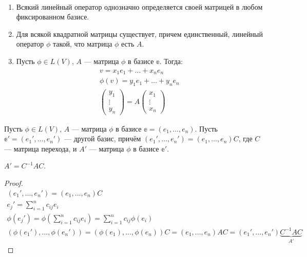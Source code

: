 \begin{Consequence}\
    \begin{enumerate}
        \item Всякий линейный оператор однозначно определяется своей матрицей в любом фиксированном базисе.
        \item Для всякой квадратной матрицы существует, причем единственный, линейный оператор $\phi$ такой, что матрица $\phi$ есть $A$.
        \item Пусть $\phi \in L(V)$, $A$ --- матрица $\phi$ в базисе $\mathbb{e}$. Тогда:
        \begin{gather*}
            v = x_1e_1 + \ldots + x_ne_n\\ \phi(v) = y_1e_1 + \ldots + y_n e_n \\
            \begin{pmatrix}
                y_1\\
                \vdots \\
                y_n
            \end{pmatrix} = A \begin{pmatrix}
                x_1\\
                \vdots \\
                x_n
            \end{pmatrix}
        \end{gather*}
    \end{enumerate}
\end{Consequence}
Пусть $\phi \in L(V)$, $A$ --- матрица $\phi$ в базисе $\mathbb{e} = (e_1, \ldots, e_n)$. Пусть $\mathbb{e}' = (e_1', \ldots, e_n')$ --- другой базис, причём $(e_1', \ldots, e_n') = (e_1, \ldots, e_n)C$, где $C$ --- матрица перехода, и $A'$ --- матрица $\phi$ в базисе $\mathbb{e}'$.
\begin{Suggestion}
    $A' = C^{-1}AC$.
\end{Suggestion}
\begin{proof}
    \begin{gather}
        (e_1', \ldots, e_n') = (e_1, \ldots, e_n)C  \\
        e_j' = \sum\limits_{i=1}^{n} c_{ij}e_i \\
        \phi(e_j') = \phi\left(\sum\limits_{i=1}^{n} c_{ij}e_i\right) = \sum\limits_{i=1}^nc_{ij}\phi(e_i)\\
        (\phi(e_1'), \ldots, \phi(e_n')) = (\phi(e_1),\ldots,\phi(e_n))C = (e_1, \ldots, e_n)AC= (e_1', \ldots, e_n')\underbrace{C^{-1}AC}_{A'}
    \end{gather}
\end{proof}

